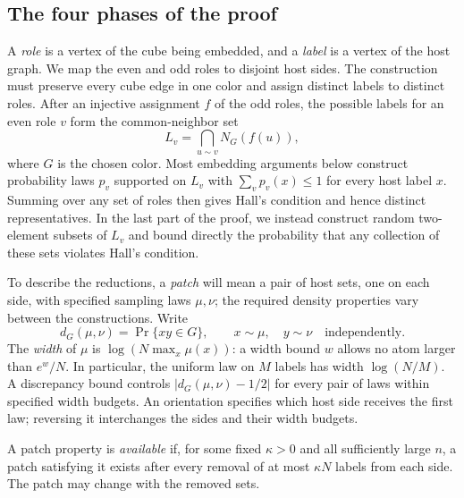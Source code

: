 \subsection{The four phases of the proof}
\label{sec:four-proof-phases}

A \emph{role} is a vertex of the cube being embedded, and a \emph{label}
is a vertex of the host graph. We map the even and odd roles to disjoint
host sides. The construction must preserve every cube edge in one color
and assign distinct labels to distinct roles. After an injective assignment
$f$ of the odd roles, the possible labels for an even role $v$ form the
common-neighbor set
\[
 L_v=\bigcap_{u\sim v}N_G(f(u)),
\]
where $G$ is the chosen color. Most embedding arguments below construct
probability laws $p_v$ supported on $L_v$ with
$\sum_v p_v(x)\le1$ for every host label $x$. Summing over any set of roles
then gives Hall's condition and hence distinct representatives. In the
last part of the proof, we instead construct random two-element subsets
of $L_v$ and bound directly the probability that any collection of these
sets violates Hall's condition.

To describe the reductions, a \emph{patch} will mean a pair of host sets,
one on each side, with specified sampling laws $\mu,\nu$; the required
density properties vary between the constructions. Write
\[
 d_G(\mu,\nu)=\Pr\{xy\in G\},\qquad x\sim\mu,\quad y\sim\nu
 \quad\text{independently}.
\]
The \emph{width} of $\mu$ is $\log(N\max_x\mu(x))$: a width bound $w$
allows no atom larger than $e^w/N$. In particular, the uniform law on
$M$ labels has width $\log(N/M)$. A discrepancy bound controls
$|d_G(\mu,\nu)-1/2|$ for every pair of laws within specified width budgets.
An orientation specifies which host side receives the first law; reversing
it interchanges the sides and their width budgets.

A patch property is \emph{available} if, for some fixed $\kappa>0$ and
all sufficiently large $n$, a patch satisfying it exists after every
removal of at most $\kappa N$ labels from each side. The patch may
change with the removed sets.

